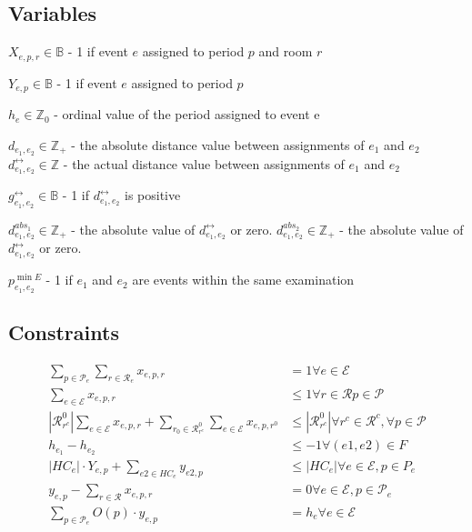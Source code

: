 \documentclass{article}
\newcommand{\scriptP}{\mathcal{P}}
\newcommand{\scriptR}{\mathcal{R}}
\newcommand{\scriptE}{\mathcal{E}}
\newcommand{\B}{\mathbb{B}}
\newcommand{\Z}{\mathbb{Z}}
\begin{document}
\subsection{Variables}

$X_{e,p,r} \in \B$ - 1 if event $e$ assigned to period $p$ and room $r$

$Y_{e,p} \in \B$ - 1 if event $e$ assigned to period $p$

$h_e\in \Z_0$ - ordinal value of the period assigned to event e

$d_{e_1, e_2} \in \Z_+$ - the absolute distance value between assignments of $e_1$ and $e_2$
$d^{\leftrightarrow}_{e_1, e_2} \in \Z$ - the actual distance value between assignments of $e_1$ and $e_2$

$g^{\leftrightarrow}_{e_1, e_2} \in \B$ - 1 if $d^{\leftrightarrow}_{e_1, e_2}$ is positive

$d^{abs_1}_{e_1, e_2}\in \Z_+$ - the absolute value of $d^{\leftrightarrow}_{e_1, e_2}$ or zero.
$d^{abs_2}_{e_1, e_2}\in \Z_+$ - the absolute value of $d^{\leftrightarrow}_{e_1, e_2}$ or zero.

$p^{\min E}_{e_1, e_2}$ - 1 if $e_1$ and $e_2$ are events within the same examination

\bigbreak

\subsection{Constraints}

\begin{align}
    \sum_{p\in\scriptP_e}\sum_{r\in\scriptR_e} x_{e,p,r} &= 1 \forall e \in \scriptE \\
    \sum_{e\in \scriptE} x_{e,p,r} &\le 1 \forall r \in \scriptR p \in \scriptP \\
    |\scriptR^0_{r^c}| \sum_{e\in\scriptE} x_{e,p,r} + \sum_{r_0\in\scriptR^0_{r^c}}\sum_{e\in \scriptE}x_{e,p,r^0} &\le |\scriptR^0_{r^c}| \forall r^c \in \scriptR^c, \forall p \in \scriptP \\
    h_{e_1} - h_{e_2} &\le -1 \forall(e1, e2) \in F \\
    |HC_{e}| \cdot Y_{e,p} + \sum_{e2 \in HC_e}y_{e2, p} &\le |HC_{e}| \forall e\in \scriptE, p \in P_{e} \\
    y_{e,p} - \sum_{r\in\scriptR} x_{e,p,r} &= 0 \forall e \in \scriptE, p \in \scriptP_e \\
    \sum_{p\in \scriptP_e}O(p) \cdot y_{e,p} &= h_{e} \forall e \in \scriptE \\
\end{align}
\end{document}
